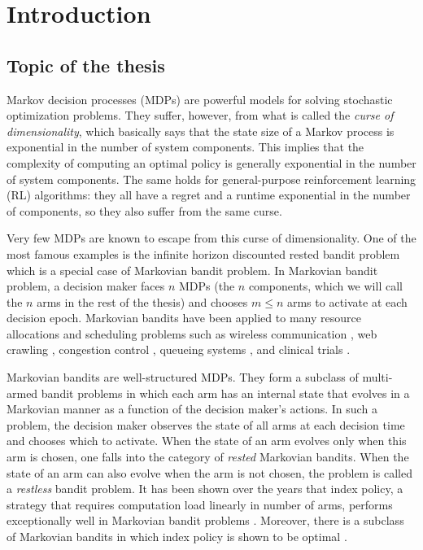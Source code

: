 \begingroup
\let\clearpage\relax

\chapter{Introduction}
\label{chapter:introduction}

\section{Topic of the thesis}

Markov decision processes (MDPs) are powerful models for solving stochastic optimization problems. They suffer, however, from what is called the \emph{curse of dimensionality}, which basically says that the state size of a Markov process is exponential in the number of system components. This implies that the complexity of computing an optimal policy is generally exponential in the number of system components. The same holds for general-purpose reinforcement learning (RL) algorithms: they all have a regret and a runtime exponential in the number of components, so they also suffer from the same curse.

Very few MDPs are known to escape from this curse of dimensionality. One of the most famous examples is the infinite horizon discounted rested bandit problem which is a special case of Markovian bandit problem. In Markovian bandit problem, a decision maker faces $n$ MDPs (the $n$ components, which we will call the $n$ arms in the rest of the thesis) and chooses $m\le n$ arms to activate at each decision epoch.
Markovian bandits have been applied to many resource allocations and scheduling problems such as wireless communication \cite{raghunathan2008index, liu2010indexability, aalto2019whittle}, web crawling \cite{nino2014dynamic, avrachenkov2022whittle}, congestion control \cite{avrachenkov2013congestion, avrachenkov2018impulsive}, queueing systems \cite{glazebrook2009index, aalto2009gittins, archibald2009indexability, aalto2011properties, larranaga2015asymptotically, borkar2017whittle, scully2018soap}, and clinical trials \cite{villar2015multi}.

Markovian bandits are well-structured MDPs.
They form a subclass of multi-armed bandit problems in which each arm has an internal state that evolves in a Markovian manner as a function of the decision maker’s actions.
In such a problem, the decision maker observes the state of all arms at each decision time and chooses which to activate.
When the state of an arm evolves only when this arm is chosen, one falls into the category of \emph{rested} Markovian bandits.
When the state of an arm can also evolve when the arm is not chosen, the problem is called a \emph{restless} bandit problem.
It has been shown over the years that index policy, a strategy that requires computation load linearly in number of arms, performs exceptionally well in Markovian bandit problems \cite{glazebrook2002index, ansell2003whittle, glazebrook2006some, avrachenkov2013congestion, akbarzadeh2019restless}.
Moreover, there is a subclass of Markovian bandits in which index policy is shown to be optimal \cite{gittins1979bandit}.

